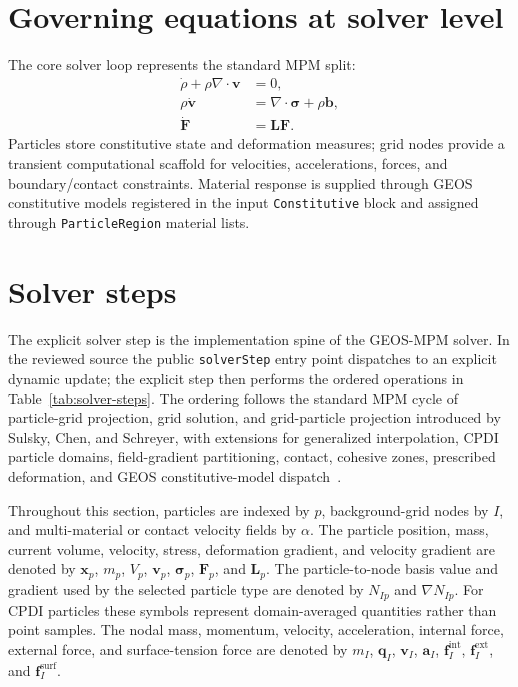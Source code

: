 \section{Governing equations at solver level}
The core solver loop represents the standard MPM split:
\begin{align*}
  \dot{\rho} + \rho \nabla \cdot \mathbf{v} &= 0, \\
  \rho \dot{\mathbf{v}} &= \nabla \cdot \boldsymbol{\sigma} + \rho \mathbf{b}, \\
  \dot{\mathbf{F}} &= \mathbf{L}\mathbf{F}.
\end{align*}
Particles store constitutive state and deformation measures; grid nodes provide a transient computational scaffold for velocities, accelerations, forces, and boundary/contact constraints.  Material response is supplied through GEOS constitutive models registered in the input \texttt{Constitutive} block and assigned through \texttt{ParticleRegion} material lists.

\section{Solver steps}
\label{sec:solver-steps}
The explicit solver step is the implementation spine of the GEOS-MPM solver.  In the reviewed source the public \texttt{solverStep} entry point dispatches to an explicit dynamic update; the explicit step then performs the ordered operations in Table~\ref{tab:solver-steps}.  The ordering follows the standard MPM cycle of particle-grid projection, grid solution, and grid-particle projection introduced by Sulsky, Chen, and Schreyer, with extensions for generalized interpolation, CPDI particle domains, field-gradient partitioning, contact, cohesive zones, prescribed deformation, and GEOS constitutive-model dispatch~\cite{sulsky1994history,bardenhagen2004gimp,sadeghirad2011cpdi,homel2016domaindef,homel2016dfg}.

Throughout this section, particles are indexed by $p$, background-grid nodes by $I$, and multi-material or contact velocity fields by $\alpha$.  The particle position, mass, current volume, velocity, stress, deformation gradient, and velocity gradient are denoted by $\mathbf{x}_p$, $m_p$, $V_p$, $\mathbf{v}_p$, $\boldsymbol{\sigma}_p$, $\mathbf{F}_p$, and $\mathbf{L}_p$.  The particle-to-node basis value and gradient used by the selected particle type are denoted by $N_{Ip}$ and $\nabla N_{Ip}$.  For CPDI particles these symbols represent domain-averaged quantities rather than point samples.  The nodal mass, momentum, velocity, acceleration, internal force, external force, and surface-tension force are denoted by $m_I$, $\mathbf{q}_I$, $\mathbf{v}_I$, $\mathbf{a}_I$, $\mathbf{f}^{\mathrm{int}}_I$, $\mathbf{f}^{\mathrm{ext}}_I$, and $\mathbf{f}^{\mathrm{surf}}_I$.

